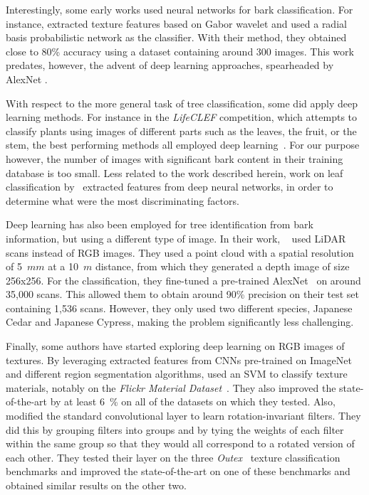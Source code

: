 \documentclass[letterpaper, 10 pt, conference]{ieeeconf}  %
\begin{document}
Interestingly, some early works used neural networks for bark classification. For instance, \cite{HuangZhi-Kai;Huang2006} extracted texture features based on Gabor wavelet and used a radial basis probabilistic network as the classifier. With their method, they obtained close to 80\% accuracy using a dataset containing around 300 images. This work predates, however, the advent of deep learning approaches, spearheaded by AlexNet \cite{AlexNet}.


With respect to the more general task of tree classification, some did apply deep learning methods. For instance in the \textit{LifeCLEF} competition, which attempts to classify plants using images of different parts such as the leaves, the fruit, or the stem, the best performing methods all employed deep learning~\cite{Champ,Sulc,Sunderhauf,goeau2017plant}. For our purpose however, the number of images with significant bark content in their training database is too small. Less related to the work described herein, work on leaf classification by~\cite{Lee20171} extracted features from deep neural networks, in order to determine what were the most discriminating factors.


Deep learning has also been employed for tree identification from bark information, but using a different type of image. In their work, ~\cite{Mizoguchi} used LiDAR scans instead of RGB images. They used a point cloud with a spatial resolution of 5~$mm$ at a 10~$m$ distance, from which they generated a depth image of size 256x256. For the classification, they fine-tuned a pre-trained AlexNet~\cite{AlexNet} on around 35,000 scans. This allowed them to obtain around 90\% precision on their test set containing 1,536 scans. However, they only used two different species, Japanese Cedar and Japanese Cypress, making the problem significantly less challenging.


Finally, some authors have started exploring deep learning on RGB images of textures. By leveraging extracted features from CNNs pre-trained on ImageNet and different region segmentation algorithms, \cite{Cimpoi_2015_CVPR} used an SVM to classify texture materials, notably on the \emph{Flickr Material Dataset}~\cite{Sharan2009}. They also improved the state-of-the-art by at least 6~\% on all of the datasets on which they tested. Also, \cite{7899932} modified the standard convolutional layer to learn rotation-invariant filters. They did this by grouping filters into groups and by tying the weights of each filter within the same group so that they would all correspond to a rotated version of each other. They tested their layer on the three \emph{Outex}~\cite{mvg:314} texture classification benchmarks and improved the state-of-the-art on one of these benchmarks and obtained similar results on the other two.
\end{document}
